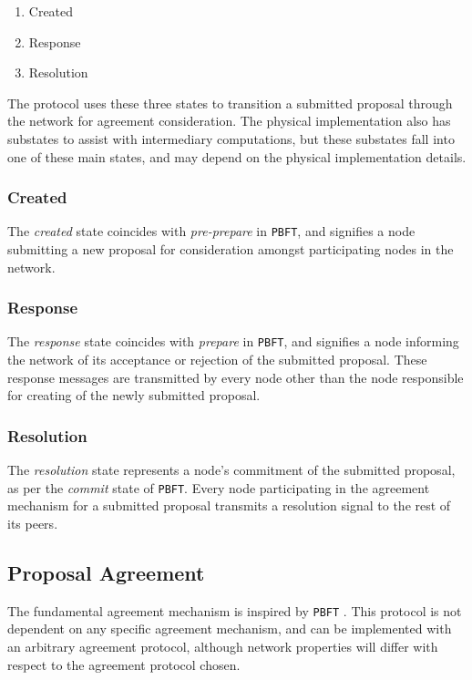 \documentclass[10pt, titlepage, twocolumn]{report}
\begin{document}
\begin{enumerate}
	\item Created
	\item Response
	\item Resolution 
\end{enumerate}

\hspace*{15pt}
The protocol uses these three states to transition a submitted proposal through the network for agreement consideration. The physical implementation also has substates to assist with intermediary computations, but these substates fall into one of these main states, and may depend on the physical implementation details.  

\subsubsection{Created}
\hspace*{15pt}
The \textit{created} state coincides with \textit{pre-prepare} in \texttt{PBFT}, and signifies a node submitting a new proposal for consideration amongst participating nodes in the network.

\subsubsection{Response}
\hspace*{15pt}
The \textit{response} state coincides with \textit{prepare} in \texttt{PBFT}, and signifies a node informing the network of its acceptance or rejection of the submitted proposal. These response messages are transmitted by every node other than the node responsible for creating of the newly submitted proposal.

\subsubsection{Resolution}
\hspace*{15pt}
The \textit{resolution} state represents a node's commitment of the submitted proposal, as per the \textit{commit} state of \texttt{PBFT}. Every node participating in the agreement mechanism for a submitted proposal transmits a resolution signal to the rest of its peers.


\subsection{Proposal Agreement}
\hspace*{15pt}
The fundamental agreement mechanism is inspired by \texttt{PBFT} \cite{PBFTC}. This protocol is not dependent on any specific agreement mechanism, and can be implemented with an arbitrary agreement protocol, although network properties will differ with respect to the agreement protocol chosen.
\end{document}
